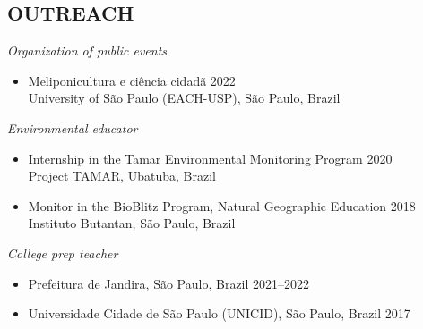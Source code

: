 \documentclass[margin, 10pt]{res} %
\begin{document}
\begin{resume}
\section{OUTREACH}
{\sl Organization of public events}
\begin{itemize}
\item Meliponicultura e ciência cidadã \hfill 2022 \\
University of São Paulo (EACH-USP), São Paulo, Brazil
\end{itemize}

{\sl Environmental educator}
\begin{itemize}
\item Internship in the Tamar Environmental Monitoring Program \hfill 2020 \\
Project TAMAR, Ubatuba, Brazil
\item Monitor in the BioBlitz Program, Natural Geographic Education \hfill 2018 \\
Instituto Butantan, São Paulo, Brazil
\end{itemize}

{\sl College prep teacher}
\begin{itemize}
\item Prefeitura de Jandira, São Paulo, Brazil \hfill 2021--2022
\item Universidade Cidade de São Paulo (UNICID), São Paulo, Brazil \hfill 2017
\end{itemize}

\end{resume}
\end{document}
